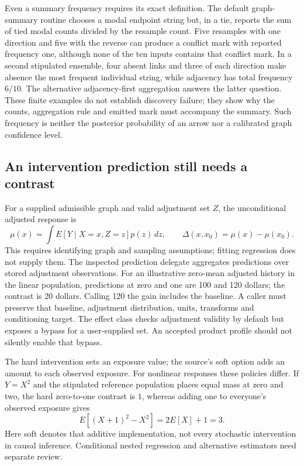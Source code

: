 Even a summary frequency requires its exact definition. The default graph-summary routine chooses a modal endpoint string but, in a tie, reports the sum of tied modal counts divided by the resample count. Five resamples with one direction and five with the reverse can produce a conflict mark with reported frequency one, although none of the ten inputs contains that conflict mark. In a second stipulated ensemble, four absent links and three of each direction make absence the most frequent individual string, while adjacency has total frequency $6/10$. The alternative adjacency-first aggregation answers the latter question. These finite examples do not establish discovery failure; they show why the counts, aggregation rule and emitted mark must accompany the summary. Such frequency is neither the posterior probability of an arrow nor a calibrated graph confidence level. \citep{exec23_tigramite_reuse_source,exec23_tigramite_reference}

\subsection{An intervention prediction still needs a contrast}
\label{exec23:tigramite-intervention}
For a supplied admissible graph and valid adjustment set $Z$, the unconditional adjusted response is
\begin{equation}
 \mu(x)=\int E[Y\mid X=x,Z=z]p(z)\,dz,\qquad
 \Delta(x,x_0)=\mu(x)-\mu(x_0).
 \label{exec23:tigramite-contrast}
\end{equation}
This requires identifying graph and sampling assumptions; fitting regression does not supply them. The inspected prediction delegate aggregates predictions over stored adjustment observations. For an illustrative zero-mean adjusted history in the linear population, predictions at zero and one are 100 and 120 dollars; the contrast is 20 dollars. Calling 120 the gain includes the baseline. A caller must preserve that baseline, adjustment distribution, units, transforms and conditioning target. The effect class checks adjustment validity by default but exposes a bypass for a user-supplied set. An accepted product profile should not silently enable that bypass. \citep{exec23_tigramite_reuse_source,exec23_tigramite_reference}

The hard intervention sets an exposure value; the source's soft option adds an amount to each observed exposure. For nonlinear responses these policies differ. If $Y=X^2$ and the stipulated reference population places equal mass at zero and two, the hard zero-to-one contrast is $1$, whereas adding one to everyone's observed exposure gives
\begin{equation}
 E[(X+1)^2-X^2]=2E[X]+1=3.
 \label{exec23:tigramite-policy}
\end{equation}
Here soft denotes that additive implementation, not every stochastic intervention in causal inference. Conditional nested regression and alternative estimators need separate review. \citep{exec23_tigramite_reuse_source,exec23_tigramite_reference}

